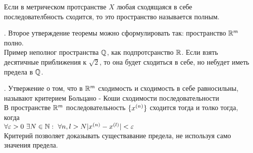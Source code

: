\Op Если в метрическом протсранстве $X$ любая сходящаяся в себе последователбность сходится, то это пространство называется полным.

. Второе утверждение теоремы можно сформулировать так: пространство $\mathbb{R}^m$ полно.\\
Пример неполног пространства $\mathbb{Q}$, как подпротсранство $\mathbb{R}$. Если взять десятичные приближения к $\sqrt{2}$, то она будет сходиться в себе, но небудет иметь предела в $\mathbb{Q}$.

. Утвержение о том, что в $\mathbb{R}^m$ сходимость и сходимость в себе равносильны, называют критерием Больцано - Коши сходимости последовательности\\
В пространстве $\mathbb{R}^m$ последовательность $\{x^{(n)}\}$ сходится тогда и толко тогда, когда\\
$\forall \eps > 0\ \exists N \in \N:\ \forall n, l > N|\pb xn - \pb xl| < \eps$\\
Критерий позволяет доказывать существавание предела, не используя само значения предела.